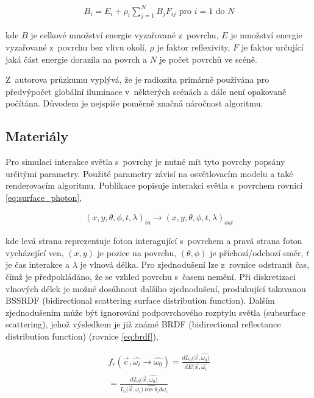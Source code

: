 \begin{equation} \label{eq:voxel_coords}
	\begin{gathered}
		B_i = E_i + \rho_i \sum^N_{j = 1}B_jF_{ij} \text{ pro } i = 1 \text{ do } N
	\end{gathered}
\end{equation}

kde $B$ je celkové množství energie vyzařované z~povrchu, $E$ je množství energie vyzařované z~povrchu bez vlivu okolí, $\rho$ je faktor reflexivity, $F$ je faktor určující jaká část energie dorazila na povrch a $N$ je počet povrchů ve scéně.

Z~autorova průzkumu vyplývá, že je radiozita primárně používána pro předvýpočet globální iluminace v~některých scénách a dále není opakovaně počítána. Důvodem je nejspíše poměrně značná náročnost algoritmu.

\subsection{Materiály}
Pro simulaci interakce světla s~povrchy je nutné mít tyto povrchy popsány určitými parametry. Použité parametry závisí na osvětlovacím modelu a také renderovacím algoritmu. Publikace \cite{materials} popisuje interakci světla s~povrchem rovnicí \ref{eq:surface_photon},

\begin{equation} \label{eq:surface_photon}
	\begin{gathered}
		(x, y, \theta, \phi, t, \lambda)_{in} \xrightarrow{} (x, y, \theta, \phi, t, \lambda)_{out}
	\end{gathered}
\end{equation}

kde levá strana reprezentuje foton interagující s~povrchem a pravá strana foton vycházející ven, $(x, y)$ je pozice na povrchu, $(\theta, \phi)$ je příchozí/odchozí směr, $t$ je čas interakce a $\lambda$ je vlnová délka. Pro zjednodušení lze z~rovnice odstranit čas, čímž je předpokládáno, že se vzhled povrchu s~časem nemění. Při diskretizaci vlnových délek je možné dosáhnout dalšího zjednodušení, produkující takzvanou BSSRDF (bidirectional scattering surface distribution function). Dalším zjednodušením může být ignorování podpovrchového rozptylu světla (subsurface scattering), jehož výsledkem je již známé BRDF (bidirectional reflectance distribution function) (rovnice \ref{eq:brdf}),

\begin{equation} \label{eq:brdf}
	\begin{gathered}
		f_r(\vec{c}, \hat{\omega_i} \xrightarrow{} \hat{\omega_0}) = \frac{dL_0(\vec{x}, \hat{\omega_0)}}{dE(\vec{x}, \hat{\omega_i}} \\
		= \frac{dL_0(\vec{x}, \hat{\omega_0)}}{L_i(\vec{x}, \hat{\omega_i)\cos \theta_i d\omega_i}}
	\end{gathered}
\end{equation}

